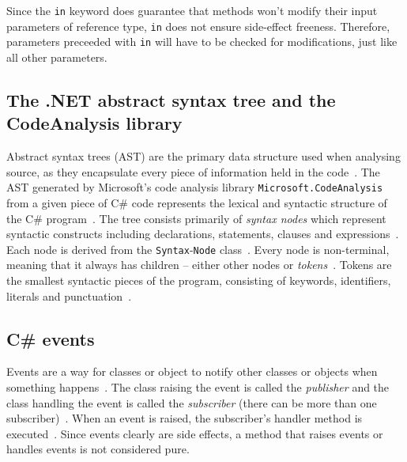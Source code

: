\documentclass[a4paper,12pt]{article}
\begin{document}
Since the \texttt{in} keyword does guarantee that methods won't modify their input parameters of reference type, \texttt{in} does not ensure side-effect freeness. Therefore, parameters preceeded with \texttt{in} will have to be checked for modifications, just like all other parameters.

\subsection{The .NET abstract syntax tree and the CodeAnalysis library} \label{The .NET Abstract Syntax Tree and the CodeAnalysis library}

Abstract syntax trees (AST) are the primary data structure used when analysing source, as they encapsulate every piece of information held in the code~\cite{microsoft-work-with-syntax}. The AST generated by Microsoft's code analysis library \texttt{Microsoft.CodeAnalysis} from a given piece of C\# code represents the lexical and syntactic structure of the C\# program~\cite{microsoft-work-with-syntax}. The tree consists primarily of \textit{syntax nodes} which represent syntactic constructs including declarations, statements, clauses and expressions~\cite{microsoft-work-with-syntax}. Each node is derived from the \texttt{Syntax}-\texttt{Node} class~\cite{microsoft-work-with-syntax}. Every node is non-terminal, meaning that it always has children -- either other nodes or \textit{tokens}~\cite{microsoft-work-with-syntax}. Tokens are the smallest syntactic pieces of the program, consisting of keywords, identifiers, literals and punctuation~\cite{microsoft-work-with-syntax}.


\subsection{C\# events} \label{sub:Events}

Events are a way for classes or object to notify other classes or objects when something happens~\cite{microsoft-events}. The class raising the event is called the \textit{publisher} and the class handling the event is called the \textit{subscriber} (there can be more than one subscriber)~\cite{microsoft-events}. When an event is raised, the subscriber's handler method is executed~\cite{microsoft-events}. Since events clearly are side effects, a method that raises events or handles events is not considered pure.
\end{document}

